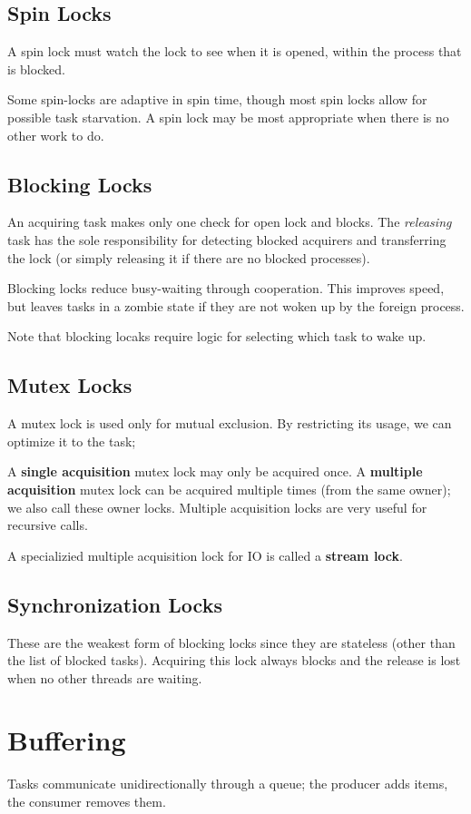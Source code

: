 \documentclass[12pt]{article}
\begin{document}
\subsection{Spin Locks}
A spin lock must watch the lock to see when it is opened, within the process that is blocked.

Some spin-locks are adaptive in spin time, though most spin locks allow for possible task starvation. A spin lock may be most appropriate when there is no other work to do.

\subsection{Blocking Locks}
An acquiring task makes only one check for open lock and blocks. The \textit{releasing} task has the sole responsibility for detecting blocked acquirers and transferring the lock (or simply releasing it if there are no blocked processes).

Blocking locks reduce busy-waiting through cooperation. This improves speed, but leaves tasks in a zombie state if they are not woken up by the foreign process.

Note that blocking locaks require logic for selecting which task to wake up.

\subsection{Mutex Locks}
A mutex lock is used only for mutual exclusion. By restricting its usage, we can optimize it to the task;

A {\bf single acquisition} mutex lock may only be acquired once. A {\bf multiple acquisition} mutex lock can be acquired multiple times (from the same owner); we also call these owner locks. Multiple acquisition locks are very useful for recursive calls.

A specializied multiple acquisition lock for IO is called a {\bf stream lock}.

\subsection{Synchronization Locks}
These are the weakest form of blocking locks since they are stateless (other than the list of blocked tasks). Acquiring this lock always blocks and the release is lost when no other threads are waiting.

\section{Buffering}
Tasks communicate unidirectionally through a queue; the producer adds items, the consumer removes them.
\end{document}
